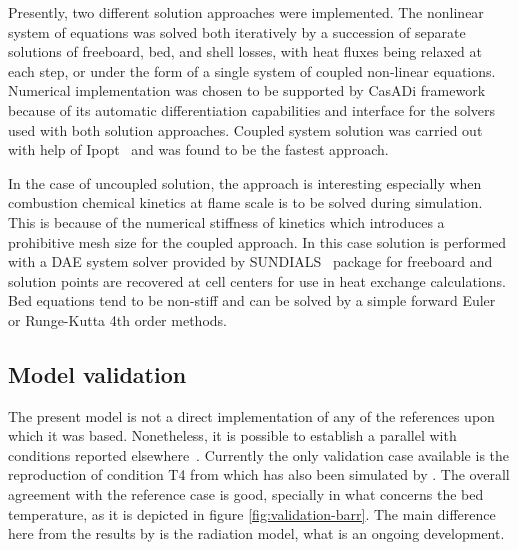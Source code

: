 \documentclass[11pt]{paper}
\begin{document}
Presently, two different solution approaches were implemented. The nonlinear system of equations was solved both iteratively by a succession of separate solutions of freeboard, bed, and shell losses, with heat fluxes being relaxed at each step, or under the form of a single system of coupled non-linear equations. Numerical implementation was chosen to be supported by CasADi framework~\cite{Andersson2018} because of its automatic differentiation capabilities and interface for the solvers used with both solution approaches. Coupled system solution was carried out with help of Ipopt~\cite{Wachter2005} and was found to be the fastest approach.


In the case of uncoupled solution, the approach is interesting especially when combustion chemical kinetics at flame scale is to be solved during simulation. This is because of the numerical stiffness of kinetics which introduces a prohibitive mesh size for the coupled approach. In this case solution is performed with a {DAE} system solver provided by {SUNDIALS}~\cite{Hindmarsh2005} package for freeboard and solution points are recovered at cell centers for use in heat exchange calculations. Bed equations tend to be non-stiff and can be solved by a simple forward Euler or Runge-Kutta 4th order methods.

\subsection{Model validation}

The present model is not a direct implementation of any of the references upon which it was based. Nonetheless, it is possible to establish a parallel with conditions reported elsewhere~\cite{Barr1986PhD,Hanein2017}. Currently the only validation case available is the reproduction of condition T4 from \textcite{Barr1986PhD} which has also been simulated by \textcite{Hanein2017}. The overall agreement with the reference case is good, specially in what concerns the bed temperature, as it is depicted in figure \ref{fig:validation-barr}. The main difference here from the results by \textcite{Hanein2017} is the radiation model, what is an ongoing development.
\end{document}
